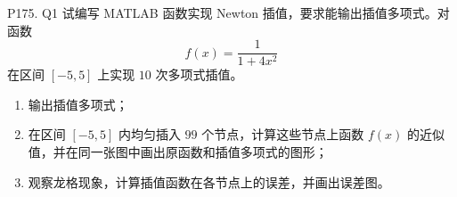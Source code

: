 \documentclass[11pt, a4paper]{ctexart}
\begin{document}
\begin{problem}{P175. Q1}
    试编写 MATLAB 函数实现 Newton 插值，要求能输出插值多项式。对函数
    \[
        f(x)=\frac{1}{1+4x^2}
    \]
    在区间 $[-5,5]$ 上实现 $10$ 次多项式插值。
    \begin{enumerate}[1.]
        \item 输出插值多项式；
        \item 在区间 $[-5,5]$ 内均匀插入 $99$ 个节点，计算这些节点上函数 $f(x)$ 的近似值，并在同一张图中画出原函数和插值多项式的图形；
        \item 观察龙格现象，计算插值函数在各节点上的误差，并画出误差图。
    \end{enumerate}
\end{problem}
\end{document}
